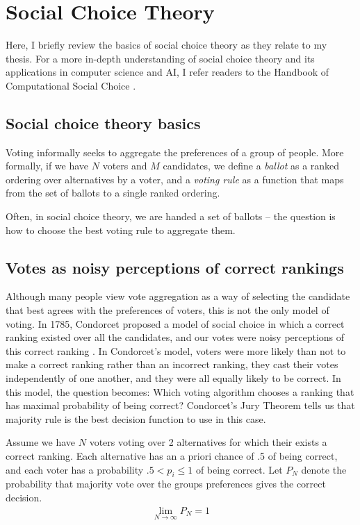 \section{Social Choice Theory}
Here, I briefly review the basics of social choice theory as they relate to my thesis. For a more in-depth understanding of social choice theory and its applications in computer science and AI, I refer readers to the Handbook of Computational Social Choice \cite{compsocialchoice}.

\subsection{Social choice theory basics}
Voting informally seeks to aggregate the preferences of a group of people. More formally, if we have $N$ voters and $M$ candidates, we define a \textit{ballot} as a ranked ordering over alternatives by a voter, and a \textit{voting rule} as a function that maps from the set of ballots to a single ranked ordering.

Often, in social choice theory, we are handed a set of ballots -- the question is how to choose the best voting rule to aggregate them.

\subsection{Votes as noisy perceptions of correct rankings}
Although many people view vote aggregation as a way of selecting the candidate that best agrees with the preferences of voters, this is not the only model of voting. In 1785, Condorcet proposed a model of social choice in which a correct ranking existed over all the candidates, and our votes were noisy perceptions of this correct ranking \cite{condorcet}. In Condorcet's model, voters were more likely than not to make a correct ranking rather than an incorrect ranking, they cast their votes independently of one another, and they were all equally likely to be correct. In this model, the question becomes: Which voting algorithm chooses a ranking that has maximal probability of being correct? Condorcet's Jury Theorem tells us that majority rule is the best decision function to use in this case.\cite{condorcet}
\begin{theorem}
Assume we have $N$ voters voting over 2 alternatives for which their exists a correct ranking. Each alternative has an a priori chance of .5 of being correct, and each voter has a probability $.5 < p_i \leq 1$ of being correct. Let $P_N$ denote the probability that majority vote over the groups preferences gives the correct decision.
\begin{align*}
\lim_{N \to \infty} P_N = 1
\end{align*}
\end{theorem}

